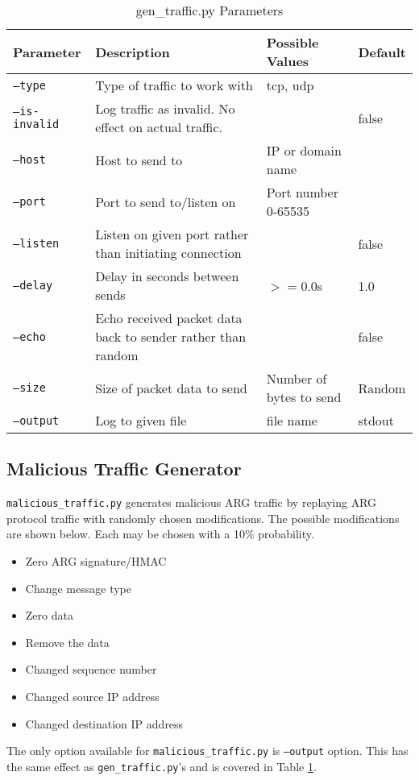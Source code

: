 \begin{table}
\caption{gen\_traffic.py Parameters}
\label{tbl:gen_traffic_param}
\centering
\begin{tabular}{l|p{2in}|l|l}
Parameter & Description & Possible Values & Default\\
\hline
\texttt{--type} & Type of traffic to work with & tcp, udp & \\
\texttt{--is-invalid} & Log traffic as invalid. No effect on actual traffic. & & false\\
\texttt{--host} & Host to send to & \ac{IP} or domain name & \\
\texttt{--port} & Port to send to/listen on & Port number 0-65535 & \\
\texttt{--listen} & Listen on given port rather than initiating connection & & false\\
\texttt{--delay} & Delay in seconds between sends & $>=$0.0s & 1.0\\
\texttt{--echo} & Echo received packet data back to sender rather than random & & false\\
\texttt{--size} & Size of packet data to send & Number of bytes to send & Random\\
\texttt{--output} & Log to given file & file name & stdout
\end{tabular}
\end{table}

\subsection{Malicious Traffic Generator}
\par \texttt{malicious\_traffic.py} generates malicious ARG traffic by replaying \ac{ARG} protocol traffic with randomly chosen modifications. The possible modifications are shown below. Each may be chosen with a 10\% probability.
{\singlespace
\begin{itemize}
\item Zero \ac{ARG} signature/\ac{HMAC}
\item Change message type
\item Zero data
\item Remove the data
\item Changed sequence number
\item Changed source \ac{IP} address
\item Changed destination \ac{IP} address
\end{itemize}
}

\par The only option available for \texttt{malicious\_traffic.py} is \texttt{--output} option. This has the same effect as \texttt{gen\_traffic.py}'s and is covered in Table \ref{tbl:gen_traffic_param}.

